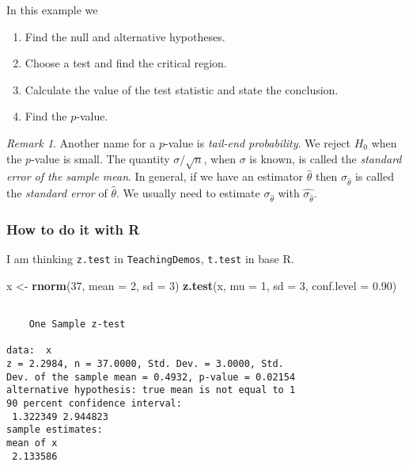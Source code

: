 \documentclass[]{book}
\newenvironment{Shaded}{\begin{snugshade}}{\end{snugshade}}
\newcommand{\KeywordTok}[1]{\textcolor[rgb]{0.13,0.29,0.53}{\textbf{{#1}}}}
\newcommand{\DataTypeTok}[1]{\textcolor[rgb]{0.13,0.29,0.53}{{#1}}}
\newcommand{\DecValTok}[1]{\textcolor[rgb]{0.00,0.00,0.81}{{#1}}}
\newcommand{\FloatTok}[1]{\textcolor[rgb]{0.00,0.00,0.81}{{#1}}}
\newcommand{\StringTok}[1]{\textcolor[rgb]{0.31,0.60,0.02}{{#1}}}
\newcommand{\NormalTok}[1]{{#1}}
\providecommand{\tightlist}{%
  \setlength{\itemsep}{0pt}\setlength{\parskip}{0pt}}
\numberwithin{equation}{chapter}
\numberwithin{figure}{chapter}
\theoremstyle{plain}
\theoremstyle{definition}
\theoremstyle{remark}
\theoremstyle{definition}
\theoremstyle{definition}
\theoremstyle{remark}
\newtheorem*{remark}{Remark}
\let\BeginKnitrBlock\begin \let\EndKnitrBlock\end
\begin{document}
\bigskip

\BeginKnitrBlock{example}
\protect\hypertarget{ex:unnamed-chunk-395}{}{\label{ex:unnamed-chunk-395}}In
this example we

\begin{enumerate}
\def\labelenumi{\arabic{enumi}.}
\tightlist
\item
  Find the null and alternative hypotheses.
\item
  Choose a test and find the critical region.
\item
  Calculate the value of the test statistic and state the conclusion.
\item
  Find the \(p\)-value.
\end{enumerate}
\EndKnitrBlock{example}

\begin{remark}
Another name for a \(p\)-value is \emph{tail-end probability}. We reject
\(H_{0}\) when the \(p\)-value is small. The quantity
\(\sigma/\sqrt{n}\), when \(\sigma\) is known, is called the
\emph{standard error of the sample mean}. In general, if we have an
estimator \(\hat{\theta}\) then \(\sigma_{\hat{\theta}}\) is called the
\emph{standard error} of \(\hat{\theta}\). We usually need to estimate
\(\sigma_{\hat{\theta}}\) with \(\hat{\sigma_{\hat{\theta}}}\).
\end{remark}

\subsubsection{How to do it with R}\label{how-to-do-it-with-r-40}

I am thinking \texttt{z.test}  in
\texttt{TeachingDemos}, \texttt{t.test} 
in base R.

\begin{Shaded}
\begin{Highlighting}[]
\NormalTok{x <-}\StringTok{ }\KeywordTok{rnorm}\NormalTok{(}\DecValTok{37}\NormalTok{, }\DataTypeTok{mean =} \DecValTok{2}\NormalTok{, }\DataTypeTok{sd =} \DecValTok{3}\NormalTok{)}
\KeywordTok{z.test}\NormalTok{(x, }\DataTypeTok{mu =} \DecValTok{1}\NormalTok{, }\DataTypeTok{sd =} \DecValTok{3}\NormalTok{, }\DataTypeTok{conf.level =} \FloatTok{0.90}\NormalTok{)}
\end{Highlighting}
\end{Shaded}

\begin{verbatim}

    One Sample z-test

data:  x
z = 2.2984, n = 37.0000, Std. Dev. = 3.0000, Std.
Dev. of the sample mean = 0.4932, p-value = 0.02154
alternative hypothesis: true mean is not equal to 1
90 percent confidence interval:
 1.322349 2.944823
sample estimates:
mean of x 
 2.133586 
\end{verbatim}
\end{document}
